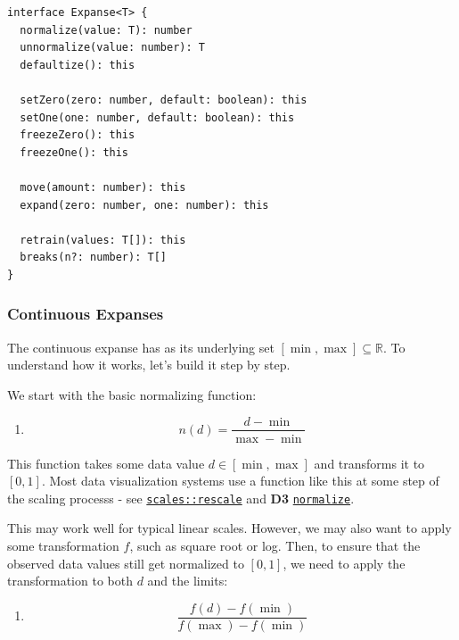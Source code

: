 \documentclass[
]{book}
\providecommand{\tightlist}{%
  \setlength{\itemsep}{0pt}\setlength{\parskip}{0pt}}
\theoremstyle{definition}
\theoremstyle{definition}
\theoremstyle{definition}
\theoremstyle{definition}
\theoremstyle{remark}
\begin{document}
\begin{verbatim}
interface Expanse<T> {
  normalize(value: T): number
  unnormalize(value: number): T
  defaultize(): this
  
  setZero(zero: number, default: boolean): this
  setOne(one: number, default: boolean): this
  freezeZero(): this
  freezeOne(): this
  
  move(amount: number): this
  expand(zero: number, one: number): this
  
  retrain(values: T[]): this
  breaks(n?: number): T[]  
}
\end{verbatim}

\subsubsection{Continuous Expanses}\label{continuous-expanses}

The continuous expanse has as its underlying set \([\min, \max] \subseteq \mathbb{R}\). To understand how it works, let's build it step by step.

We start with the basic normalizing function:

\begin{enumerate}
\def\labelenumi{\arabic{enumi}.}
\tightlist
\item
  \[n(d) = \frac{d - \min}{\max - \min}\]
\end{enumerate}

This function takes some data value \(d \in [\min, \max]\) and transforms it to \([0, 1]\). Most data visualization systems use a function like this at some step of the scaling processs - see \href{https://github.com/r-lib/scales/blob/84560bf54e02315477a05384ee67991e9e8fc52c/R/bounds.R\#L85}{\texttt{scales::rescale}} and \textbf{D3} \href{https://github.com/d3/d3-scale/blob/d6904a4bde09e16005e0ad8ca3e25b10ce54fa0d/src/continuous.js\#L122}{\texttt{normalize}}.

This may work well for typical linear scales. However, we may also want to apply some transformation \(f\), such as square root or log. Then, to ensure that the observed data values still get normalized to \([0, 1]\), we need to apply the transformation to both \(d\) and the limits:

\begin{enumerate}
\def\labelenumi{\arabic{enumi}.}
\setcounter{enumi}{1}
\tightlist
\item
  \[\frac{f(d) - f(\min)}{f(\max) - f(\min)}\]
\end{enumerate}
\end{document}

